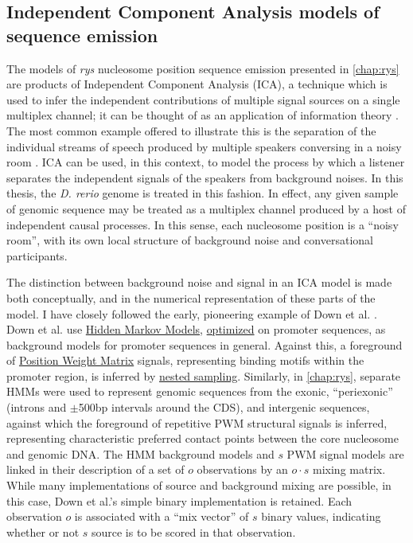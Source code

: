\documentclass{ut-thesis}
\begin{document}
\begin{NoHyper}
\subsection{Independent Component Analysis models of sequence emission}
\label{ssec:ICA}
The models of \textit{rys} nucleosome position sequence emission presented in \autoref{chap:rys} are products of Independent Component Analysis (ICA), a technique which is used to infer the independent contributions of multiple signal sources on a single multiplex channel; it can be thought of as an application of information theory \cite{Lee2000}. The most common example offered to illustrate this is the separation of the individual streams of speech produced by multiple speakers conversing in a noisy room \cite{Jong-HwanLee2000}. ICA can be used, in this context, to model the process by which a listener separates the independent signals of the speakers from background noises. In this thesis, the \textit{D. rerio} genome is treated in this fashion. In effect, any given sample of genomic sequence may be treated as a multiplex channel produced by a host of independent causal processes. In this sense, each nucleosome position is a ``noisy room'', with its own local structure of background noise and conversational participants. 

The distinction between background noise and signal in an ICA model is made both conceptually, and in the numerical representation of these parts of the model. I have closely followed the early, pioneering example of Down et al. \cite{Down2005}. Down et al. use \hyperref[ssec:HMM]{Hidden Markov Models}, \hyperref[ssec:MLE]{optimized} on promoter sequences, as background models for promoter sequences in general. Against this, a foreground of \hyperref[ssec:PWM]{Position Weight Matrix} signals, representing binding motifs within the promoter region, is inferred by \hyperref[ssec:nested]{nested sampling}. Similarly, in \autoref{chap:rys}, separate HMMs were used to represent genomic sequences from the exonic, ``periexonic'' (introns and $\pm$500bp intervals around the CDS), and intergenic sequences, against which the foreground of repetitive PWM structural signals is inferred, representing characteristic preferred contact points between the core nucleosome and genomic DNA. The HMM background models and $s$ PWM signal models are linked in their description of a set of $o$ observations by an $o \cdot s$ mixing matrix. While many implementations of source and background mixing are possible, in this case, Down et al.'s simple binary implementation is retained. Each observation $o$ is associated with a ``mix vector'' of $s$ binary values, indicating whether or not $s$ source is to be scored in that observation.


\end{NoHyper}
\end{document}
